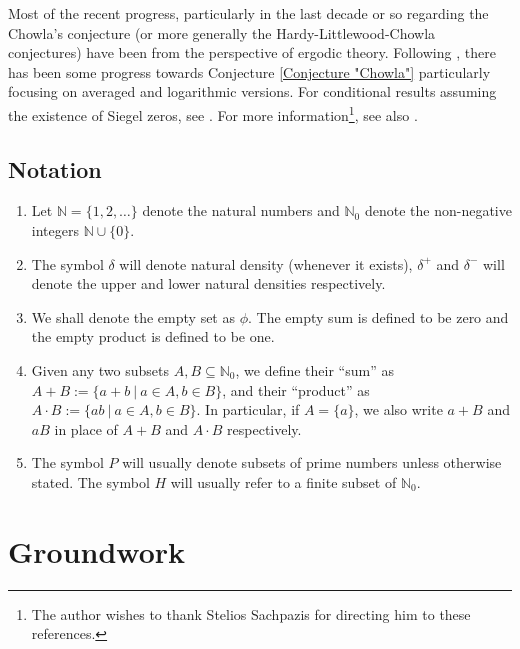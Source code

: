 \documentclass[12pt, a4paper]{amsart}
\theoremstyle{remark}
\theoremstyle{proof}
\numberwithin{equation}{section}
\numberwithin{assumption}{section}
\newcommand{\N}{\mathbb{N}}
\begin{document}
	Most of the recent progress, particularly in the last decade or so regarding the Chowla's conjecture (or more generally the Hardy-Littlewood-Chowla conjectures) have been from the perspective of ergodic theory. Following \cite{MatoRadz}, there has been some progress towards Conjecture \ref{Conjecture "Chowla"} particularly focusing on averaged \cite{MatoRadzTao1, MatoRadzTao2} and logarithmic \cite{TaoForum, TaoTeravainenDuke} versions. For conditional results assuming the existence of Siegel zeros, see \cite{TaoTeravainenJLMS}. For more information\footnote{The author wishes to thank Stelios Sachpazis for directing him to these references.}, see also \cite{chinis2021siegelzerossarnaksconjecture,jaskari2024chowlaconjecturelandausiegelzeroes,TaoTeraBordeux, Lith1, Lith2,pilatte2023improvedboundstwopointlogarithmic, helfgott2021expansiondivisibilityparity}.
	
	
	
	\subsection*{Notation}
	
	\begin{enumerate}
		\item 	Let $\N = \{1,2,\ldots\}$ denote the natural numbers and $\N_0$ denote the non-negative integers $\N\cup\{0\}$.
		\item	The symbol $\delta$ will denote natural density (whenever it exists), $\delta^+$ and $\delta^-$ will denote the upper and lower natural densities respectively.
		\item 	We shall denote the empty set as $\phi$. The empty sum is defined to be zero and the empty product is defined to be one.
		\item 	Given any two subsets $A,B\subseteq \N_0$, we define their ``sum'' as $A+B := \{a+b\ |\ a\in A, b\in B\}$, and their ``product'' as $A\cdot B:= \{ab\ |\ a\in A, b\in B\}$. In particular, if $A=\{a\}$, we also write $a+B$ and $aB$ in place of $A+B$ and $A\cdot B$ respectively.
		\item 	The symbol $P$ will usually denote subsets of prime numbers unless otherwise stated. The symbol $H$ will usually refer to a finite subset of $\N_0$.
	\end{enumerate}
	
	\section{Groundwork}\label{Section "Groundwork"}
	
\end{document}
